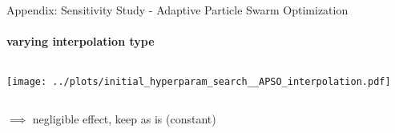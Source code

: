 \documentclass[11pt,aspectratio=169]{beamer}
\begin{document}
%
%

\begin{closingframe}{Appendix: Sensitivity Study - Adaptive Particle Swarm Optimization}
    \framesubtitle{varying \textbf{interpolation type}}

    \begin{columns}
    \begin{column}{0.8\textwidth}
        \texttt{[image: ../plots/initial\_hyperparam\_search\_\_APSO\_interpolation.pdf]}
    \end{column}
    \end{columns}

    \begin{columns}
        \begin{column}{0.8\textwidth}
            $\implies$ negligible effect, keep as is (constant)
        \end{column}
        \begin{column}{0.1\textwidth}
            \tiny{}
        \end{column}
    \end{columns}
\end{closingframe}
\end{document}
